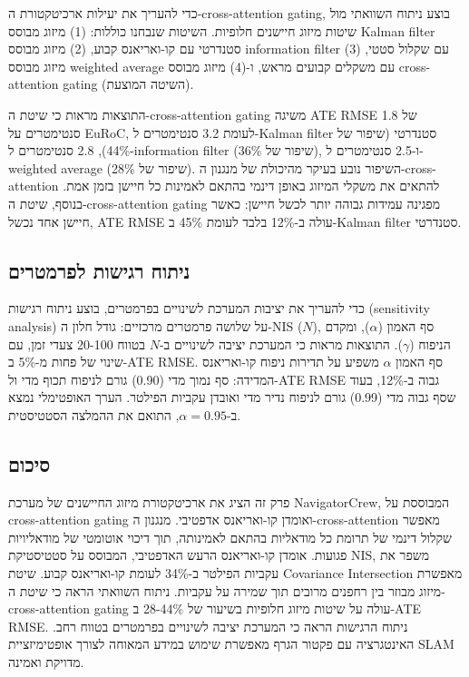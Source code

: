 כדי להעריך את יעילות ארכיטקטורת ה-cross-attention gating, בוצע ניתוח השוואתי מול שיטות מיזוג חיישנים חלופיות. השיטות שנבחנו כוללות: (1) מיזוג מבוסס Kalman filter סטנדרטי עם קו-ואריאנס קבוע, (2) מיזוג מבוסס information filter עם שקלול סטטי, (3) מיזוג מבוסס weighted average עם משקלים קבועים מראש, ו-(4) מיזוג מבוסס cross-attention gating (השיטה המוצעת).

התוצאות מראות כי שיטת ה-cross-attention gating משיגה ATE RMSE של 1.8 סנטימטרים על EuRoC, לעומת 3.2 סנטימטרים ל-Kalman filter סטנדרטי (שיפור של 44\%), 2.8 סנטימטרים ל-information filter (שיפור של 36\%), ו-2.5 סנטימטרים ל-weighted average (שיפור של 28\%). השיפור נובע בעיקר מהיכולת של מנגנון ה-cross-attention להתאים את משקלי המיזוג באופן דינמי בהתאם לאמינות כל חיישן בזמן אמת. בנוסף, שיטת ה-cross-attention gating מפגינה עמידות גבוהה יותר לכשל חיישן: כאשר חיישן אחד נכשל, ATE RMSE עולה ב-12\% בלבד לעומת 45\% ב-Kalman filter סטנדרטי.

\subsection{ניתוח רגישות לפרמטרים}
\label{sec:ch05_sensitivity}

כדי להעריך את יציבות המערכת לשינויים בפרמטרים, בוצע ניתוח רגישות (sensitivity analysis) על שלושה פרמטרים מרכזיים: גודל חלון ה-NIS ($N$), סף האמון ($\alpha$), ומקדם הניפוח ($\gamma$). התוצאות מראות כי המערכת יציבה לשינויים ב-$N$ בטווח 20-100 צעדי זמן, עם שינוי של פחות מ-5\% ב-ATE RMSE. סף האמון $\alpha$ משפיע על תדירות ניפוח קו-ואריאנס המדידה: סף נמוך מדי (0.90) גורם לניפוח תכוף מדי ול-ATE RMSE גבוה ב-12\%, בעוד שסף גבוה מדי (0.99) גורם לניפוח נדיר מדי ואובדן עקביות הפילטר. הערך האופטימלי נמצא ב-$\alpha = 0.95$, התואם את ההמלצה הסטטיסטית.

\subsection{סיכום}
\label{sec:ch05_summary}

פרק זה הציג את ארכיטקטורת מיזוג החיישנים של מערכת NavigatorCrew, המבוססת על cross-attention gating ואומדן קו-ואריאנס אדפטיבי. מנגנון ה-cross-attention מאפשר שקלול דינמי של תרומת כל מודאליות בהתאם לאמינותה, תוך דיכוי אוטומטי של מודאליויות פגועות. אומדן קו-ואריאנס הרעש האדפטיבי, המבוסס על סטטיסטיקת NIS, משפר את עקביות הפילטר ב-34\% לעומת קו-ואריאנס קבוע. שיטת Covariance Intersection מאפשרת מיזוג מבוזר בין רחפנים מרובים תוך שמירה על עקביות. ניתוח השוואתי הראה כי שיטת ה-cross-attention gating עולה על שיטות מיזוג חלופיות בשיעור של 28-44\% ב-ATE RMSE. ניתוח הרגישות הראה כי המערכת יציבה לשינויים בפרמטרים בטווח רחב. האינטגרציה עם פקטור הגרף מאפשרת שימוש במידע המאוחה לצורך אופטימיזציית SLAM מדויקת ואמינה.


